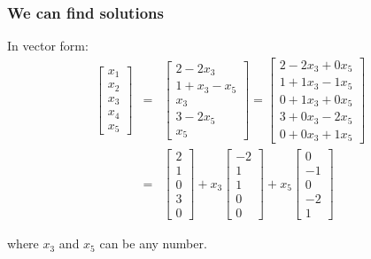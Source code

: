 \begin{frame}
  \frametitle{We can find solutions}

  In vector form:
  \begin{eqnarray*}
    \left[ \begin{array}{r}x_1\\x_2\\x_3\\x_4\\x_5\end{array}\right] & = &
    \left[ \begin{array}{r}2-2x_3\\1+x_3-x_5\\x_3\\3-2x_5\\x_5\end{array}\right]=
    \left[ \begin{array}{r}2-2x_3+0x_5\\1+1x_3-1x_5\\0+1x_3+0x_5\\3+0x_3-2x_5\\0+0x_3+1x_5\end{array}\right]
    \\
    & = &
    \left[ \begin{array}{r}2\\1\\0\\3\\0\end{array}\right]
    + x_3 \left[ \begin{array}{r}-2\\1\\1\\0\\0\end{array}\right]
    + x_5 \left[ \begin{array}{r}0\\-1\\0\\-2\\1\end{array}\right]
  \end{eqnarray*}

  where $x_3$ and $x_5$ can be any number.


\end{frame}


